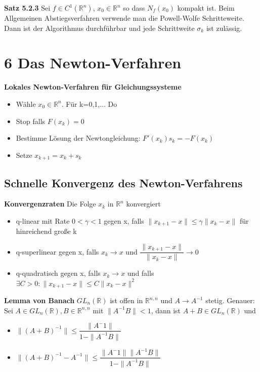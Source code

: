\documentclass[a4paper,10pt]{article}
\begin{document}
\textbf{Satz 5.2.3}
Sei $f\in C^1(\mathbb{R}^n)$, $x_0\in \mathbb{R}^n$ so dass $N_f(x_0)$ kompakt ist. Beim Allgemeinen Abstiegsverfahren verwende man die Powell-Wolfe Schritteweite. Dann ist der Algorithmus durchführbar und jede Schrittweite $\sigma_k$ ist zulässig.

\section*{6 Das Newton-Verfahren}
\textbf{Lokales Newton-Verfahren für Gleichungssysteme}
\begin{itemize}
\item Wähle $x_0\in \mathbb{R}^n$. Für k=0,1,... Do
\item Stop falls $F(x_k)=0$
\item Bestimme Lösung der Newtongleichung: $F'(x_k)s_k=-F(x_k)$
\item Setze $x_{k+1}=x_k+s_k$
\end{itemize}

\subsection{Schnelle Konvergenz des Newton-Verfahrens}
\textbf{Konvergenzraten}
Die Folge $x_k$ in $\mathbb{R}^n$ konvergiert
\begin{itemize}
\item q-linear mit Rate $0<\gamma<1$ gegen x, falls $\|x_{k+1}-x\|\leq \gamma \|x_k-x\|$ für hinreichend große k
\item q-superlinear gegen x, falls $x_k\rightarrow x$ und $\dfrac{\|x_{k+1}-x\|}{\|x_k-x\|}\rightarrow 0$
\item q-quadratisch gegen x, falls $x_k\rightarrow x$ und falls $\exists C>0:\|x_{k+1}-x\|\leq C\|x_k-x\|^2$
\end{itemize}

\textbf{Lemma von Banach}
$GL_n(\mathbb{R})$ ist offen in $\mathbb{R}^{n,n}$ und $A\rightarrow A^{-1}$ stetig. Genauer: Sei $A\in GL_n(\mathbb{R}), B\in \mathbb{R}^{n,n}$ mit $\|A^{-1}B\|<1$, dann ist $A+B\in GL_n(\mathbb{R})$ und \begin{itemize}
\item $\|(A+B)^{-1}\|\leq \dfrac{\|A^-1\|}{1-\|A^{-1}B\|}$
\item $\|(A+B)^{-1}-A^{-1}\|\leq \dfrac{\|A^-1\| \|A^{-1}B\|}{1-\|A^{-1}B\|}$
\end{itemize}
\end{document}
